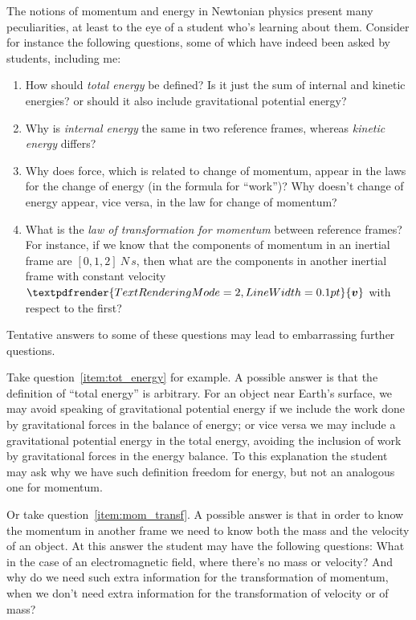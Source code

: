 \documentclass[\ifafour a4paper,12pt,\else a5paper,10pt,\fi%
onecolumn,oneside,article,%
british%
]{memoir}
\renewcommand*{\bm}[1]{\textpdfrender{TextRenderingMode=2,LineWidth=0.1pt}{\boldsymbol{#1}}}
\renewcommand*{\|}[1][]{\nonscript\:#1\vert\nonscript\:\mathopen{}}
\begin{document}
The notions of momentum and energy in Newtonian physics present many peculiarities, at least to the eye of a student who's learning about them. %
Consider for instance the following questions, some of which have indeed been asked by students, including me:
\begin{enumerate}
\item\label{item:tot_energy} How should \emph{total energy} be defined? Is it just the sum of internal and kinetic energies? or should it also include gravitational potential energy?
\item\label{item:internalenergy_invariant} Why is \emph{internal energy} the same in two reference frames, whereas \emph{kinetic energy} differs?
\item\label{item:force_energyflux} Why does force, which is related to change of momentum, appear in the laws for the change of energy (in the formula for \enquote{work})? Why doesn't change of energy appear, vice versa, in the law for change of momentum?
\item\label{item:mom_transf} What is the \emph{law of transformation for momentum} between reference frames? For instance, if we know that the components of momentum in an inertial frame are $[0,1,2]\:\unit{N\,s}$, then what are the components in another inertial frame with constant velocity $\bm{v}$ with respect to the first?
\end{enumerate}

Tentative answers to some of these questions may lead to embarrassing further questions.

Take question~\ref{item:tot_energy} for example. A possible answer is that the definition of \enquote{total energy} is arbitrary. For an object near Earth's surface, we may avoid speaking of gravitational potential energy if we include the work done by gravitational forces in the balance of energy; or vice versa we may include a gravitational potential energy in the total energy, avoiding the inclusion of work by gravitational forces in the energy balance. To this explanation the student may ask why we have such definition freedom for energy, but not an analogous one for momentum.

Or take question~\ref{item:mom_transf}. A possible answer is that in order to know the momentum in another frame we need to know both the mass and the velocity of an object. At this answer the student may have the following questions: What in the case of an electromagnetic field, where there's no mass or velocity? And why do we need such extra information for the transformation of momentum, when we don't need extra information for the transformation of velocity or of mass?
\end{document}
